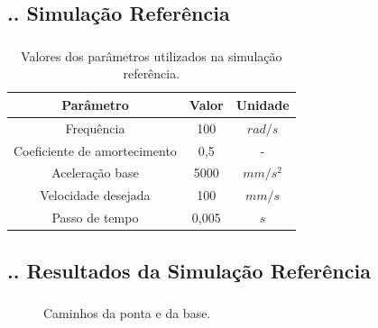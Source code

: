 \documentclass[aspectratio=169]{beamer}
\begin{document}
\subsection{\insertsectionnumber .\insertsubsectionnumber . Simulação Referência}
\begin{frame}
  \frametitle{\insertsubsection}
  \begin{table}
    \begin{center}
    \caption{Valores dos parâmetros utilizados na simulação referência.}
    \label{tab:base_params}
    \begin{tabular}{c c c}
        Parâmetro & Valor & Unidade\\ \hline
        Frequência & 100 & $rad/s$\\
        Coeficiente de amortecimento & 0,5 & - \\
        Aceleração base & 5000 & $mm/s^2$ \\
        Velocidade desejada & 100 & $mm/s$ \\
        Passo de tempo & 0,005 & $s$ \\ \hline
    \end{tabular}
    \end{center}
  \end{table}
\end{frame}

\subsection{\insertsectionnumber .\insertsubsectionnumber . Resultados da Simulação Referência}

\begin{frame}
  \frametitle{\insertsubsection}
  \begin{figure}[H]
    \centering
    \caption{Caminhos da ponta e da base.}
    \hfill
  \end{figure}
\end{frame}
\end{document}
